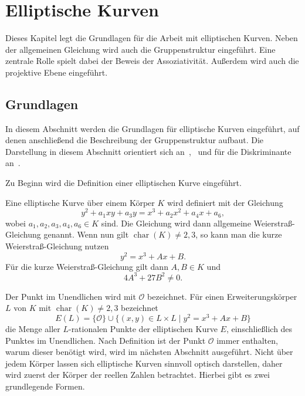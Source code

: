 \chapter{Elliptische Kurven}
Dieses Kapitel legt die Grundlagen für die Arbeit mit elliptischen Kurven. Neben der allgemeinen Gleichung wird auch die Gruppenstruktur eingeführt. Eine zentrale Rolle spielt dabei der Beweis der Assoziativität. Außerdem wird auch die projektive Ebene eingeführt.

\section{Grundlagen}
In diesem Abschnitt werden die Grundlagen für elliptische Kurven eingeführt, auf denen anschließend die Beschreibung der Gruppenstruktur aufbaut. Die Darstellung in diesem Abschnitt orientiert sich an~\cite[S.~9~ff.]{washington08},~\cite[S.~1, 6]{plaumann20} und für die Diskriminante an~\cite[S.~470~f.]{karpf24}.

Zu Beginn wird die Definition einer elliptischen Kurve eingeführt.
\begin{definition}
    Eine elliptische Kurve über einem Körper $K$ wird definiert mit der Gleichung
    \[
        y^2+a_1xy+a_3y=x^3+a_2x^2+a_4x+a_6,
    \]
    wobei \(a_1,a_2,a_3,a_4,a_6\in K\) sind. Die Gleichung wird dann allgemeine Weierstraß-Gleichung genannt. Wenn nun gilt $\operatorname{char}(K)\neq 2,3$, so kann man die kurze Weierstraß-Gleichung nutzen
    \[
        y^2=x^3+Ax+B.
    \]
    Für die kurze Weierstraß-Gleichung gilt dann $A,B\in K$ und
    \[
        4A^3+27B^2\neq 0.
    \]
\end{definition}
Der Punkt im Unendlichen wird mit \(\mathcal{O}\) bezeichnet. Für einen Erweiterungskörper $L$ von $K$ mit $\operatorname{char}(K)\neq 2,3$ bezeichnet
\[
    E(L)=\{\mathcal{O} \} \cup \{(x,y)\in L\times L\mid y^2=x^3+Ax+B\}
\]
die Menge aller $L$-rationalen Punkte der elliptischen Kurve $E$, einschließlich des Punktes im Unendlichen. Nach Definition ist der Punkt $\mathcal{O}$ immer enthalten, warum dieser benötigt wird, wird im nächsten Abschnitt ausgeführt. Nicht über jedem Körper lassen sich elliptische Kurven sinnvoll optisch darstellen, daher wird zuerst der Körper der reellen Zahlen betrachtet. Hierbei gibt es zwei grundlegende Formen.

